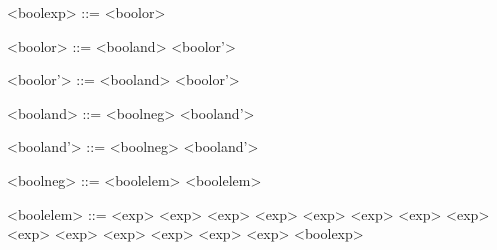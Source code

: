 \begin{grammarEx}
	<bool\textunderscore exp> ::= <bool\textunderscore or> 
	
	<bool\textunderscore or> ::= <bool\textunderscore and> <bool\textunderscore or'> 
	
	<bool\textunderscore or'> ::= \lit{\opor{}} <bool\textunderscore and> <bool\textunderscore or'> 
	\alt \lit{\textepsilon{}} 
	
	<bool\textunderscore and> ::= <bool\textunderscore neg> <bool\textunderscore and'> 
	
	<bool\textunderscore and'> ::= \lit{\opand{}} <bool\textunderscore neg> <bool\textunderscore and'> 
	\alt \textemptyword{}
	
	<bool\textunderscore neg> ::= <bool\textunderscore elem>
	\alt \lit{~} <bool\textunderscore elem>
	
	<bool\textunderscore elem> ::= <exp> \lit{\opless{}} <exp> 
	\alt <exp> \lit{\opless{}} <exp>
	\alt <exp> \lit{\opgreater{}} <exp>
	\alt <exp> \lit{\oplesseq{}} <exp>
	\alt <exp> \lit{\opgreatereq{}} <exp>
	\alt <exp> \lit{\opeq{}} <exp>
	\alt <exp> \lit{\opuneq{}} <exp>
	\alt {}
	\alt {}
	\alt \lit{[} <bool\textunderscore exp> \lit{]}
\end{grammarEx}